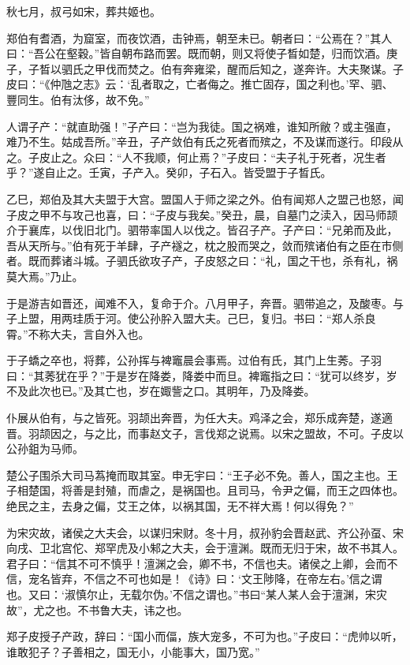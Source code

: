 \documentclass[a4paper,12pt,UTF8,twoside]{ctexbook}
\begin{document}
秋七月，叔弓如宋，葬共姬也。

郑伯有耆酒，为窟室，而夜饮酒，击钟焉，朝至未已。朝者曰：“公焉在？”其人曰：“吾公在壑穀。”皆自朝布路而罢。既而朝，则又将使子晳如楚，归而饮酒。庚子，子晳以驷氏之甲伐而焚之。伯有奔雍梁，醒而后知之，遂奔许。大夫聚谋。子皮曰：“《仲虺之志》云：‘乱者取之，亡者侮之。推亡固存，国之利也。’罕、驷、豐同生。伯有汰侈，故不免。”

人谓子产：“就直助强！”子产曰：“岂为我徒。国之祸难，谁知所敝？或主强直，难乃不生。姑成吾所。”辛丑，子产敛伯有氏之死者而殡之，不及谋而遂行。印段从之。子皮止之。众曰：“人不我顺，何止焉？”子皮曰：“夫子礼于死者，况生者乎？”遂自止之。壬寅，子产入。癸卯，子石入。皆受盟于子晳氏。

乙巳，郑伯及其大夫盟于大宫。盟国人于师之梁之外。伯有闻郑人之盟己也怒，闻子皮之甲不与攻己也喜，曰：“子皮与我矣。”癸丑，晨，自墓门之渎入，因马师颉介于襄库，以伐旧北门。驷带率国人以伐之。皆召子产。子产曰：“兄弟而及此，吾从天所与。”伯有死于羊肆，子产襚之，枕之股而哭之，敛而殡诸伯有之臣在市侧者。既而葬诸斗城。子驷氏欲攻子产，子皮怒之曰：“礼，国之干也，杀有礼，祸莫大焉。”乃止。

于是游吉如晋还，闻难不入，复命于介。八月甲子，奔晋。驷带追之，及酸枣。与子上盟，用两珪质于河。使公孙肸入盟大夫。己巳，复归。书曰：“郑人杀良霄。”不称大夫，言自外入也。

于子蟜之卒也，将葬，公孙挥与裨竈晨会事焉。过伯有氏，其门上生莠。子羽曰：“其莠犹在乎？”于是岁在降娄，降娄中而旦。裨竈指之曰：“犹可以终岁，岁不及此次也已。”及其亡也，岁在娵訾之口。其明年，乃及降娄。

仆展从伯有，与之皆死。羽颉出奔晋，为任大夫。鸡泽之会，郑乐成奔楚，遂適晋。羽颉因之，与之比，而事赵文子，言伐郑之说焉。以宋之盟故，不可。子皮以公孙鉏为马师。

楚公子围杀大司马蒍掩而取其室。申无宇曰：“王子必不免。善人，国之主也。王子相楚国，将善是封殖，而虐之，是祸国也。且司马，令尹之偏，而王之四体也。绝民之主，去身之偏，艾王之体，以祸其国，无不祥大焉！何以得免？”

为宋灾故，诸侯之大夫会，以谋归宋财。冬十月，叔孙豹会晋赵武、齐公孙虿、宋向戌、卫北宫佗、郑罕虎及小邾之大夫，会于澶渊。既而无归于宋，故不书其人。君子曰：“信其不可不慎乎！澶渊之会，卿不书，不信也夫。诸侯之上卿，会而不信，宠名皆弃，不信之不可也如是！《诗》曰：‘文王陟降，在帝左右。’信之谓也。又曰：‘淑慎尔止，无载尔伪。’不信之谓也。”书曰“某人某人会于澶渊，宋灾故”，尤之也。不书鲁大夫，讳之也。

郑子皮授子产政，辞曰：“国小而偪，族大宠多，不可为也。”子皮曰：“虎帅以听，谁敢犯子？子善相之，国无小，小能事大，国乃宽。”
\end{document}
